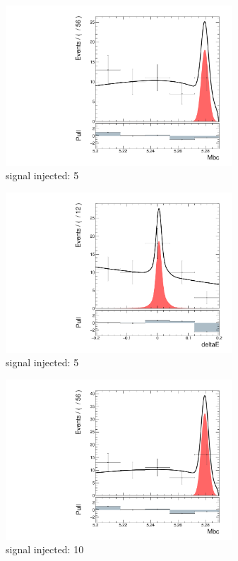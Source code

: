 \begin{figure}[htpb]
	\begin{subfigure}{0.5\linewidth}
		\includegraphics[page=1,height=6cm]{figures/injection_sig_5/ds_gen_Mbc_2D.pdf}
		\caption{signal injected: 5}
	\end{subfigure}
	\begin{subfigure}{0.5\linewidth}
		\includegraphics[page=1,height=6cm]{figures/injection_sig_5/ds_gen_deltaE_2D.pdf}
		\caption{signal injected: 5}
	\end{subfigure}
	\begin{subfigure}{0.5\linewidth}
		\includegraphics[page=1,height=6cm]{figures/injection_sig_10/ds_gen_Mbc_2D.pdf}
		\caption{signal injected: 10}
	\end{subfigure}
	\begin{subfigure}{0.5\linewidth}

\end{subfigure}
\end{figure}
